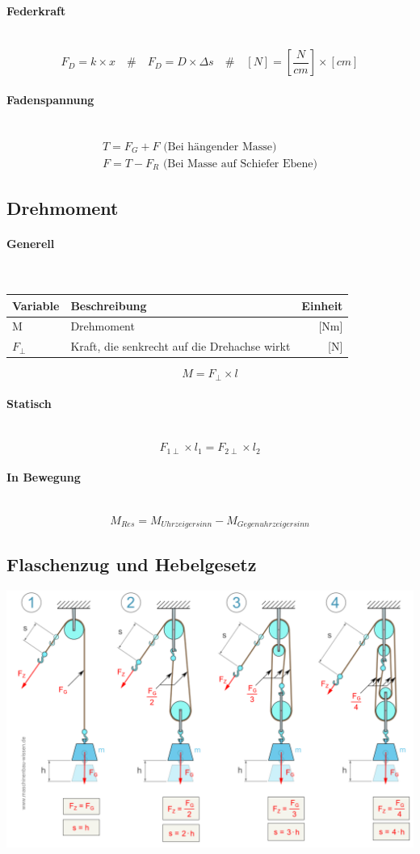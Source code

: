 \documentclass[a4paper,twoside,10pt]{article}
\newcommand{\lbparagraph}[1]{\paragraph{#1}\mbox{}\\}
\newcommand{\eqsp}[1]{\quad\#\quad}
\begin{document}
\lbparagraph{Federkraft}

\begin{equation}
    F_D = k \times x
    \eqsp{}
    F_D = D \times \Delta{s}
    \eqsp{}
    [N] = [\frac{N}{cm}] \times [cm]
\end{equation}

\lbparagraph{Fadenspannung}

\begin{gather}
    T = F_G + F \text{ (Bei hängender Masse)}
    \\
    F = T - F_R \text{ (Bei Masse auf Schiefer Ebene)}
\end{gather}

\subsection{Drehmoment}

\lbparagraph{Generell}

\begin{tabular}{l|l|r}
    Variable & Beschreibung & Einheit \\
    \hline
    M & Drehmoment & [Nm] \\
    $F_{\perp}$ & Kraft, die senkrecht auf die Drehachse wirkt & [N]
\end{tabular}

\begin{equation}
    M = F_{\perp} \times l
\end{equation}

\lbparagraph{Statisch}

\begin{equation}
    F_{1\perp} \times l_1 = F_{2\perp} \times l_2
\end{equation}

\lbparagraph{In Bewegung}

\begin{equation}
    M_{Res} = M_{Uhrzeigersinn} - M_{Gegenuhrzeigersinn}
\end{equation}

\subsection{Flaschenzug und Hebelgesetz}

\includegraphics[width=\textwidth,height=\textheight,keepaspectratio]{flaschenzug-berechnen}
\end{document}
